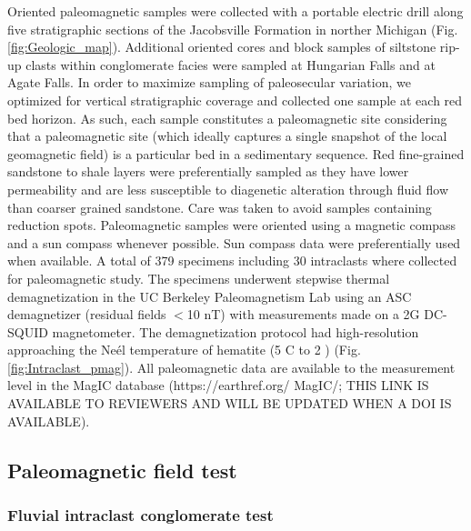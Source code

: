 \documentclass[draft]{agujournal2019}
\begin{document}
Oriented paleomagnetic samples were collected with a portable electric drill along five stratigraphic sections of the Jacobsville Formation in norther Michigan (Fig. \ref{fig:Geologic_map}). Additional oriented cores and block samples of siltstone rip-up clasts within conglomerate facies were sampled at Hungarian Falls and at Agate Falls. In order to maximize sampling of paleosecular variation, we optimized for vertical stratigraphic coverage and collected one sample at each red bed horizon. As such, each sample constitutes a paleomagnetic site considering that a paleomagnetic site (which ideally captures a single snapshot of the local geomagnetic field) is a particular bed in a sedimentary sequence. Red fine-grained sandstone to shale layers were preferentially sampled as they have lower permeability and are less susceptible to diagenetic alteration through fluid flow than coarser grained sandstone. Care was taken to avoid samples containing reduction spots. Paleomagnetic samples were oriented using a magnetic compass and a sun compass whenever possible. Sun compass data were preferentially used when available. A total of 379 specimens including 30 intraclasts where collected for paleomagnetic study. The specimens underwent stepwise thermal demagnetization in the UC Berkeley Paleomagnetism Lab using an ASC demagnetizer (residual fields $<$10 nT) with measurements made on a 2G DC-SQUID magnetometer. The demagnetization protocol had high-resolution approaching the Ne\'el temperature of hematite (5 \textdegree C to 2 \textdegreeC) (Fig. \ref{fig:Intraclast_pmag}). All paleomagnetic data are available to the measurement level in the MagIC database (https://earthref.org/ MagIC/; THIS LINK IS AVAILABLE TO REVIEWERS AND WILL BE UPDATED WHEN A DOI IS AVAILABLE).

\subsection*{Paleomagnetic field test}

\subsubsection*{Fluvial intraclast conglomerate test}
\end{document}
